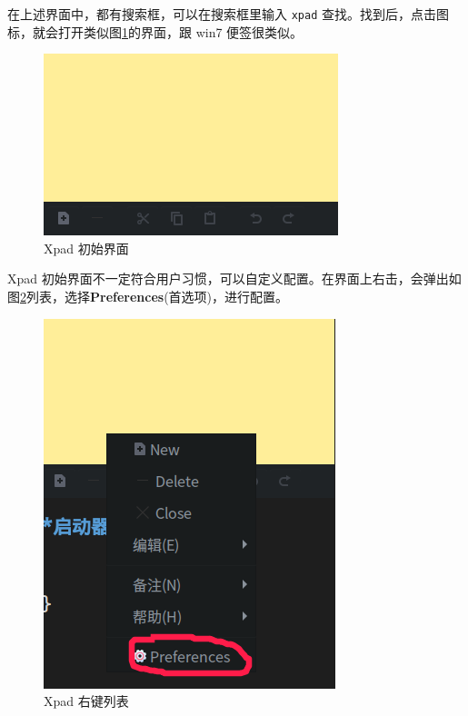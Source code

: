 \documentclass[doctor,openright,twoside]{sjtuthesis}
\newcommand{\passthrough}[1]{#1}
\theoremstyle{plain}
\theoremstyle{definition}
\theoremstyle{remark}
\theoremstyle{ocrenumbox}
\theoremstyle{plain}
\begin{document}
在上述界面中，都有搜索框，可以在搜索框里输入 \passthrough{\lstinline!xpad!} 查找。找到后，点击图标，就会打开类似图\ref{fig:xpad-start}的界面，跟 win7 便签很类似。

\begin{figure}

{\centering \includegraphics[width=0.618\linewidth]{images/education-xpad-start} 

}

\caption[Xpad 初始界面]{Xpad 初始界面}\label{fig:xpad-start}
\end{figure}

Xpad 初始界面不一定符合用户习惯，可以自定义配置。在界面上右击，会弹出如图\ref{fig:xpad-rightclick}列表，选择\textbf{Preferences}(首选项)，进行配置。

\begin{figure}

{\centering \includegraphics[width=0.618\linewidth]{images/education-xpad-rightclick} 

}

\caption[Xpad 右键列表]{Xpad 右键列表}\label{fig:xpad-rightclick}
\end{figure}
\end{document}
